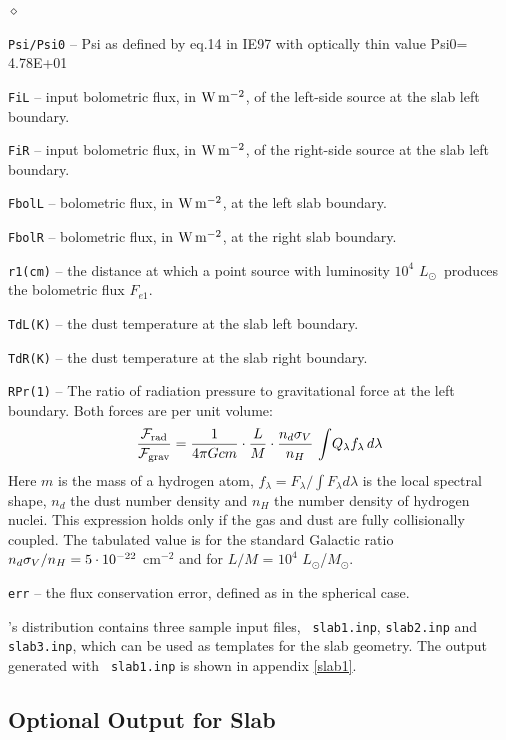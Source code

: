 \documentclass[11pt]{article}
\def\D    {{\sf DUSTY}}
\def\E#1{\hbox{$10^{#1}$}}
\def\eq#1{\begin{equation} #1 \end{equation}}
\def\Mo     {\hbox{$M_{\odot}$}}
\def\Lo     {\hbox{$L_{\odot}$}}
\def\sub#1{_{\rm #1}}
\def\Frad {\hbox{${\cal F}\sub{rad}$}}
\def\Fgrav{\hbox{${\cal F}\sub{grav}$}}
\begin{document}
\begin{list}{$\diamond$}{}
\item{\tt Psi/Psi0} -- Psi as defined by eq.14 in IE97 with optically
  thin value Psi0= 4.78E+01
\item{\tt FiL} -- input bolometric flux, in $\rm W\,m^{-2}$, of the
  left-side source at the slab left boundary.
\item{\tt FiR} -- input bolometric flux, in $\rm W\,m^{-2}$, of the
  right-side source at the slab left boundary.
\item{\tt FbolL} -- bolometric flux, in $\rm W\,m^{-2}$, at the left
  slab boundary.
\item{\tt FbolR} -- bolometric flux, in $\rm W\,m^{-2}$, at the right
  slab boundary.
\item{\tt r1(cm)} -- the distance at which a point source with
  luminosity \E4 \Lo\ produces the bolometric flux $F_{e1}$.
\item {\tt TdL(K)} -- the dust temperature at the slab left boundary.
\item {\tt TdR(K)} -- the dust temperature at the slab right boundary.
\item {\tt RPr(1)} -- The ratio of radiation pressure to gravitational
  force at the left boundary. Both forces are per unit volume: \eq{
    {\Frad\over\Fgrav} = {1\over4\pi Gcm} \cdot{L\over M}
    \cdot{n_d\sigma_V\over n_H}\, \int\!Q_\lambda f_\lambda\,d\lambda
  } Here $m$ is the mass of a hydrogen atom, $f_\lambda =
  F_\lambda/\int F_\lambda d\lambda$ is the local spectral shape,
  $n_d$ the dust number density and $n_H$ the number density of
  hydrogen nuclei.  This expression holds only if the gas and dust are
  fully collisionally coupled. The tabulated value is for the standard
  Galactic ratio $n_d\sigma_V/n_H = 5\cdot\E{-22}$ cm$^{-2}$ and for
  $L/M$ = \E4 \Lo/\Mo.
\item{\tt err} -- the flux conservation error, defined as in the
  spherical case.

\end{list}

\bigskip \D's distribution contains three sample input files, {\tt
  slab1.inp}, {\tt slab2.inp} and {\tt slab3.inp}, which can be used
as templates for the slab geometry. The output generated with {\tt
  slab1.inp} is shown in appendix \ref{slab1}.

\subsection{Optional Output for Slab}
\label{sec:optional_slb}
\end{document}
